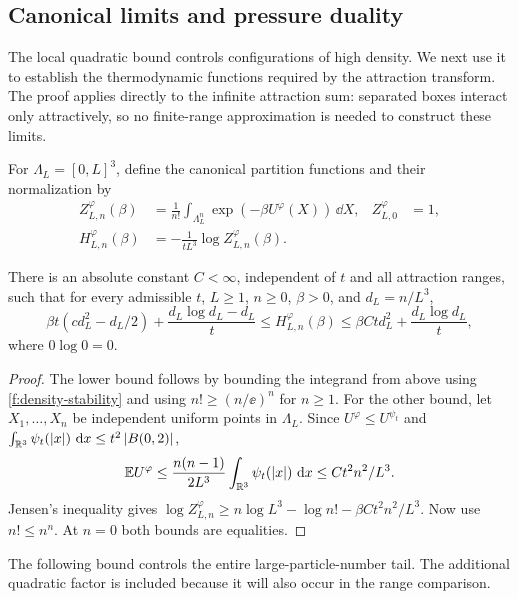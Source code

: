 \subsection{Canonical limits and pressure duality}

The local quadratic bound controls configurations of high density.
We next use it to establish the thermodynamic functions required by
the attraction transform.  The proof applies directly to the infinite
attraction sum: separated boxes interact only attractively, so no
finite-range approximation is needed to construct these limits.

For $\Lambda_L=[0,L]^3$, define the canonical partition functions
and their normalization by
\begin{equation}\label{f:canonical-definition}
 \begin{aligned}
 Z^\varphi_{L,n}(\beta)
 &=\frac1{n!}\int_{\Lambda_L^n}\exp(-\beta U^\varphi(X))\,\dd X,
 & Z^\varphi_{L,0}&=1,\\
 H^\varphi_{L,n}(\beta)&=-\frac1{tL^3}\log Z^\varphi_{L,n}(\beta).
 \end{aligned}
\end{equation}

\begin{lemma}\label{f:canonical-bounds}
There is an absolute constant $C<\infty$, independent of $t$ and all
attraction ranges, such that for every admissible $t$, $L\ge1$,
$n\ge0$, $\beta>0$, and $d_L=n/L^3$,
\begin{equation}\label{f:finite-bounds}
 \beta t(cd_L^2-d_L/2)+\frac{d_L\log d_L-d_L}{t}
 \le H^\varphi_{L,n}(\beta)
 \le \beta Ct d_L^2+\frac{d_L\log d_L}{t},
\end{equation}
where $0\log0=0$.
\end{lemma}

\begin{proof}
The lower bound follows by bounding the integrand from above using
\eqref{f:density-stability} and using $n!\ge(n/\ee)^n$ for $n\ge1$.
For the other bound, let $X_1,\ldots,X_n$ be independent uniform
points in $\Lambda_L$.  Since $U^\varphi\le U^{\psi_t}$ and
$\int_{\mathbb R^3}\psi_t(\left|x\right|)\,\,\mathrm d x\le t^2\left|B(0,2)\right|$,
\[
 \mathbb E U^\varphi
 \le\frac{n(n-1)}{2L^3}\int_{\mathbb R^3}\psi_t(\left|x\right|)\,\,\mathrm d x
 \le Ct^2n^2/L^3.
\]
Jensen's inequality gives
$\log Z^\varphi_{L,n}\ge n\log L^3-\log n!-\beta Ct^2n^2/L^3$.
Now use $n!\le n^n$.  At $n=0$ both bounds are equalities.
\end{proof}

The following bound controls the entire large-particle-number tail.
The additional quadratic factor is included because it will also
occur in the range comparison.

